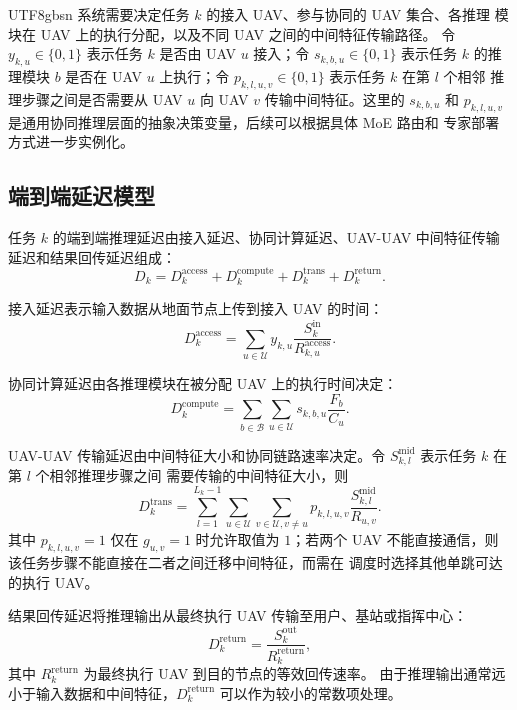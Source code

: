 \documentclass[conference]{IEEEtran}
\begin{document}
\begin{CJK*}{UTF8}{gbsn}
系统需要决定任务 $k$ 的接入 UAV、参与协同的 UAV 集合、各推理
模块在 UAV 上的执行分配，以及不同 UAV 之间的中间特征传输路径。
令 $y_{k,u}\in\{0,1\}$ 表示任务 $k$ 是否由 UAV $u$ 接入；令
$s_{k,b,u}\in\{0,1\}$ 表示任务 $k$ 的推理模块 $b$ 是否在 UAV $u$
上执行；令 $p_{k,l,u,v}\in\{0,1\}$ 表示任务 $k$ 在第 $l$ 个相邻
推理步骤之间是否需要从 UAV $u$ 向 UAV $v$ 传输中间特征。这里的
$s_{k,b,u}$ 和 $p_{k,l,u,v}$
是通用协同推理层面的抽象决策变量，后续可以根据具体 MoE 路由和
专家部署方式进一步实例化。

\subsection{端到端延迟模型}

任务 $k$ 的端到端推理延迟由接入延迟、协同计算延迟、UAV-UAV
中间特征传输延迟和结果回传延迟组成：
\begin{equation}
D_k = D_k^{\mathrm{access}} + D_k^{\mathrm{compute}}
    + D_k^{\mathrm{trans}} + D_k^{\mathrm{return}} .
\end{equation}

接入延迟表示输入数据从地面节点上传到接入 UAV 的时间：
\begin{equation}
D_k^{\mathrm{access}}
= \sum_{u\in\mathcal{U}} y_{k,u}
  \frac{S_k^{\mathrm{in}}}{R_{k,u}^{\mathrm{access}}} .
\end{equation}

协同计算延迟由各推理模块在被分配 UAV 上的执行时间决定：
\begin{equation}
D_k^{\mathrm{compute}}
= \sum_{b\in\mathcal{B}}\sum_{u\in\mathcal{U}}
   s_{k,b,u}\frac{F_b}{C_u}.
\end{equation}

UAV-UAV 传输延迟由中间特征大小和协同链路速率决定。令
$S_{k,l}^{\mathrm{mid}}$ 表示任务 $k$ 在第 $l$ 个相邻推理步骤之间
需要传输的中间特征大小，则
\begin{equation}
D_k^{\mathrm{trans}}
= \sum_{l=1}^{L_k-1}
  \sum_{u\in\mathcal{U}}\sum_{v\in\mathcal{U},v\ne u}
   p_{k,l,u,v}\frac{S_{k,l}^{\mathrm{mid}}}{R_{u,v}} .
\end{equation}
其中 $p_{k,l,u,v}=1$ 仅在 $g_{u,v}=1$ 时允许取值为 $1$；若两个 UAV
不能直接通信，则该任务步骤不能直接在二者之间迁移中间特征，而需在
调度时选择其他单跳可达的执行 UAV。

结果回传延迟将推理输出从最终执行 UAV 传输至用户、基站或指挥中心：
\begin{equation}
D_k^{\mathrm{return}}
= \frac{S_k^{\mathrm{out}}}{R_k^{\mathrm{return}}},
\end{equation}
其中 $R_k^{\mathrm{return}}$ 为最终执行 UAV 到目的节点的等效回传速率。
由于推理输出通常远小于输入数据和中间特征，$D_k^{\mathrm{return}}$
可以作为较小的常数项处理。


\end{CJK*}
\end{document}
